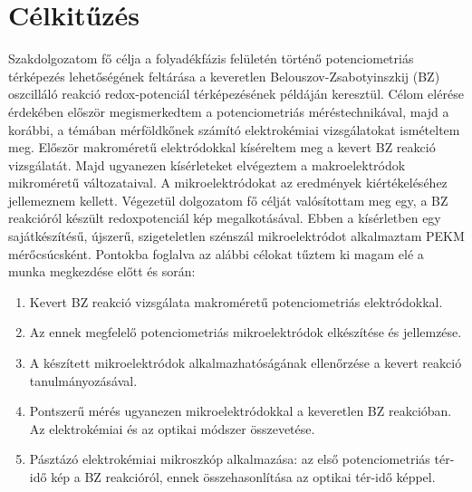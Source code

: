 \chapter{Célkitűzés}
\pagestyle{headings}
   Szakdolgozatom fő célja a folyadékfázis felületén történő potenciometriás térképezés lehetőségének feltárása a keveretlen Belouszov-Zsabotyinszkij (BZ) oszcilláló reakció redox-potenciál térképezésének példáján keresztül. Célom elérése érdekében először megismerkedtem a potenciometriás méréstechnikával, majd a korábbi, a témában mérföldkőnek számító elektrokémiai vizsgálatokat ismételtem meg. Először makroméretű elektródokkal kíséreltem meg a kevert BZ reakció vizsgálatát. Majd ugyanezen kísérleteket elvégeztem a makroelektródok mikroméretű változataival. A mikroelektródokat az eredmények kiértékeléséhez jellemeznem kellett. Végezetül dolgozatom fő célját valósítottam meg egy, a BZ reakcióról készült redoxpotenciál kép megalkotásával. Ebben a kísérletben egy sajátkészítésű, újszerű, szigeteletlen szénszál mikroelektródot alkalmaztam PEKM mérőcsúcsként. Pontokba foglalva az alábbi célokat tűztem ki magam elé a munka megkezdése előtt és során:

\begin{enumerate}
\item Kevert BZ reakció vizsgálata makroméretű potenciometriás elektródokkal.
\item Az ennek megfelelő potenciometriás mikroelektródok elkészítése és jellemzése.
\item A készített mikroelektródok alkalmazhatóságának ellenőrzése a kevert reakció tanulmányozásával.
\item Pontszerű mérés ugyanezen mikroelektródokkal a keveretlen BZ reakcióban. Az elektrokémiai és az optikai módszer összevetése.
\item Pásztázó elektrokémiai mikroszkóp alkalmazása: az első potenciometriás tér-idő kép a BZ reakcióról, ennek összehasonlítása az optikai tér-idő képpel.
\end{enumerate}

